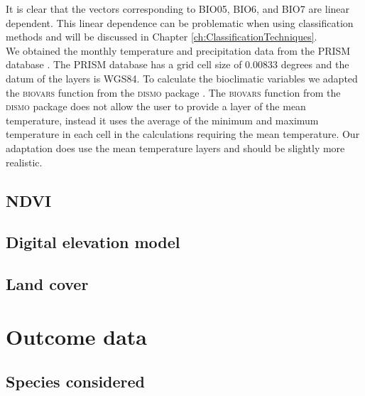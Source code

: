 It is clear that the vectors corresponding  to BIO05, BIO6, and BIO7 are linear dependent. This linear dependence can be problematic when using classification methods and will be discussed in Chapter \ref{ch:ClassificationTechniques}.\\ 

We obtained the monthly temperature and precipitation data from the PRISM database \parencite{PRISM}. The PRISM database has a grid cell size of 0.00833 degrees and the datum of the layers is WGS84. To calculate the bioclimatic variables we adapted the \textsc{biovars} function from the \textsc{dismo} package \parencite{dismo}. The \textsc{biovars} function from the \textsc{dismo} package does not allow the user to provide a layer of the mean temperature, instead it uses the average of the minimum and maximum temperature in each cell in the calculations requiring the mean temperature. Our adaptation does use the mean temperature layers and should be slightly more realistic.

\subsection{NDVI}

\subsection{Digital elevation model}

\subsection{Land cover}

\section{Outcome data}
\subsection{Species considered}

